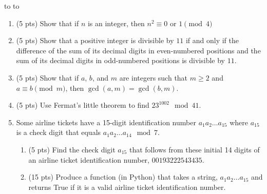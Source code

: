 \documentclass[10pt]{article}
\newcommand{\handout}{
   \renewcommand{\thepage}{H\hnumber-\arabic{page}}
   \noindent
   \begin{center}
      \vbox{
    \hbox to \columnwidth {\sc{\course} --- \prof \hfill}
    \vspace{-2mm}
    \hbox to \columnwidth {\sc due \MakeLowercase{\duedate} \duelocation\hfill {\Huge\color{mdb}H\hnumber.}}
	\vspace{15pt}
	{\Huge\yourname}
      }
   \end{center}
   \vspace*{2mm}
}
\begin{document}
\thispagestyle{empty}
\handout

\begin{enumerate}

\item (5 pts) Show that if $n$ is an integer, then $n^2 \equiv 0 $ or $1 \pmod{4}$

\item (5 pts) Show that a positive integer is divisible by $11$ if and only if the difference of the sum  of its decimal digits in even-numbered positions and the sum of its decimal digits in odd-numbered positions is divisible by $11$.

\item (5 pts) Show that if $a$, $b$, and $m$ are integers such that $m \geq 2$ and $a \equiv b \pmod{m}$, then $\gcd(a,m) = \gcd(b, m)$.

\item (5 pts) Use Fermat's little theorem to find $23^{1002} \mod 41$.

\item Some airline tickets have a 15-digit identification number $a_1a_2 \ldots a_{15}$ where $a_{15}$ is a check digit that equals $a_1a_2\ldots a_{14} \mod 7$.

\begin{enumerate}
	\item (5 pts) Find the check digit $a_{15}$ that follows from these initial 14 digits of an airline ticket identification number, $00193222543435$.
	\item (15 pts) Produce a function (in Python) that takes a string, $a_1a_2 \ldots a_{15}$ and returns True if it is a valid airline ticket identification number.
	\end{enumerate}

\end{enumerate}
\end{document}
